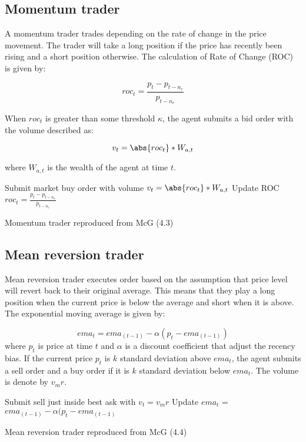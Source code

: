 \subsection{Momentum trader}
A momentum trader trades depending on the rate of change in the price movement. The trader will take a long position if the price has recently been rising and a short position otherwise. The calculation of Rate of Change (ROC) is given by: 

    \[ roc_t = \frac{p_t - p_{t-n_r}}{p_{t-n_r}} \]
    
When $roc_t$ is greater than some threshold $\kappa$, the agent submits a bid order with the volume described as:

    \[ v_t = \abs{roc_t} * W_{a,t} \]
    
where $W_{a,t}$ is the wealth of the agent at time $t$. 

\begin{algorithm}[H]
\DontPrintSemicolon 
{} {
     {
    Submit market buy order with volume $v_t = \abs{roc_t} * W_{a,t}$\;
    }
    \EndIf
  }
\EndIf
Update ROC $roc_t = \frac{p_t - p_{t-n_r}}{p_{t-n_r}}$\;  
\caption{{\sc Momentum trader reproduced from McG (4.3) \cite{McGroarty} } }
\label{algo:max}
\end{algorithm}


\subsection{Mean reversion trader}
Mean reversion trader executes order based on the assumption that price level will revert back to their original average. This means that they play a long position when the current price is below the average and short when it is above. The exponential moving average is given by: 

\[ ema_t = ema_{(t-1)} - \alpha(p_t - ema_{(t-1)}) \] where $p_t$ is price at time $t$ and $\alpha$ is a discount coefficient that adjust the recency bias. If the current price $p_t$ is $k$ standard deviation above $ema_t$, the agent submits a sell order and a buy order if it is $k$ standard deviation below $ema_t$. The volume is denote by $v_mr$.

\begin{algorithm}[H]
\DontPrintSemicolon 
{} {
     {
    Submit sell just inside best ask with $v_t = v_mr$\;
    }
    \EndIf
  }
\EndIf
Update $ema_t$ = $ema_{(t-1)} - \alpha(p_t - ema_{(t-1)}$
\caption{{\sc Mean reversion trader reproduced from McG (4.4) \cite{McGroarty}} }
\label{algo:max}
\end{algorithm}


